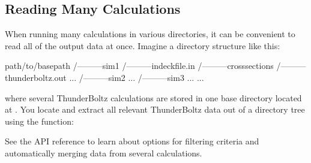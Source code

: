 \documentclass[letterpaper,10pt,english,openany,oneside]{sphinxmanual}
\begin{document}
\subsection{Reading Many Calculations}
\label{\detokenize{ext_guide:reading-many-calculations}}
\sphinxAtStartPar
When running many calculations in various directories, it can be convenient to
read all of the output data at once. Imagine a directory structure like this:

\begin{sphinxVerbatim}[commandchars=\\\{\}]
path/to/base\PYGZus{}path
 /———sim1
     /———indeck\PYGZus{}file.in
     /———cross\PYGZus{}sections
     /———thunderboltz.out
     ...
 /———sim2
     ...
 /———sim3
     ...
 ...
\end{sphinxVerbatim}

\sphinxAtStartPar
where several ThunderBoltz calculations are stored in one base directory
located at . You locate and extract all relevant
ThunderBoltz data out of a directory tree using the {\hyperref[\detokenize{api/pytb.tb.query_tree:pytb.tb.query_tree}]{}}
function:

\begin{sphinxVerbatim}[commandchars=\\\{\}]
 

  


\PYG{p}{[}\PYG{p}{]}

\PYG{p}{[}\PYG{p}{]}
\end{sphinxVerbatim}

\sphinxAtStartPar
See the {\hyperref[\detokenize{api/pytb.tb.query_tree:pytb.tb.query_tree}]{}} API reference to learn about options for filtering
criteria and automatically merging data from several calculations.
\end{document}
